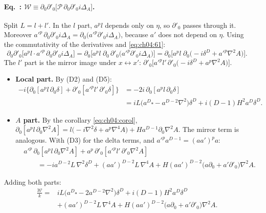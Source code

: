 \paragraph{Eq.~: $\mathcal W\equiv\partial_0\partial'_0\big[\mathcal P\,\partial_0\partial'_0 i\Delta_A\big]$.}
Split $L=l+l'$.
In the $l$ part, $a^pl$ depends only on $\eta$, so $\partial'_0$ passes through it.
Moreover $a'^p\,\partial_0\partial'_0 i\Delta_A=\partial_0\big(a'^p\partial'_0 i\Delta_A\big)$, because $a'$ does not depend on $\eta$.
Using the commutativity of the derivatives and \eqref{eq:ch04:61}:
\begin{equation}
\partial_0\partial'_0\big[a^pl\cdot a'^p\,\partial_0\partial'_0 i\Delta_A\big]
=\partial_0\big[a^pl\;\partial_0\,\partial'_0\big(a'^p\partial'_0 i\Delta_A\big)\big]
=\partial_0\big[a^pl\;\partial_0\big(-i\delta^D+a'^p\nabla^2A\big)\big].
\end{equation}
The $l'$ part is the mirror image under $x\leftrightarrow x'$: $\partial'_0\big[a'^pl'\,\partial'_0\big(-i\delta^D+a^p\nabla^2A\big)\big]$.
\begin{itemize}[leftmargin=1.2em,itemsep=3pt]
\item \textbf{Local part.} By (D2) and (D5):
\begin{equation}
\begin{aligned}
-i\big\{\partial_0[a^pl\,\partial_0\delta]+\partial'_0[a'^pl'\,\partial'_0\delta]\big\}&=-2i\,\partial_0[a^pl\,\partial_0\delta]\\
&=iL\big(a^D\square-a^{D-2}\nabla^2\big)\delta^D+i(D-1)H^2a^D\delta^D .
\end{aligned}
\end{equation}
\item \textbf{$A$ part.} By the corollary \eqref{eq:ch04:corol},
$\partial_0[a^pl\,\partial_0\nabla^2A]=l\big(-i\nabla^2\delta+a^p\nabla^4A\big)+Ha^{D-1}\partial_0\nabla^2A$.
The mirror term is analogous. With (D3) for the delta terms, and $a'^pa^{D-1}=(aa')^pa$:
\begin{equation}
\begin{aligned}
&a'^p\,\partial_0[a^pl\,\partial_0\nabla^2A]+a^p\,\partial'_0[a'^pl'\,\partial'_0\nabla^2A]\\
&\qquad=-ia^{D-2}L\,\nabla^2\delta^D+(aa')^{D-2}L\,\nabla^4A+H(aa')^{D-2}\big(a\partial_0+a'\partial'_0\big)\nabla^2A .
\end{aligned}
\end{equation}
\end{itemize}
Adding both parts:
\begin{equation}
\begin{aligned}
\frac{\mathcal W}{k}={}&iL\big(a^D\square-2a^{D-2}\nabla^2\big)\delta^D+i(D-1)H^2a^D\delta^D\\
&+(aa')^{D-2}L\,\nabla^4A+H(aa')^{D-2}\big(a\partial_0+a'\partial'_0\big)\nabla^2A .
\end{aligned}
\label{eq:ch04:W}
\end{equation}
